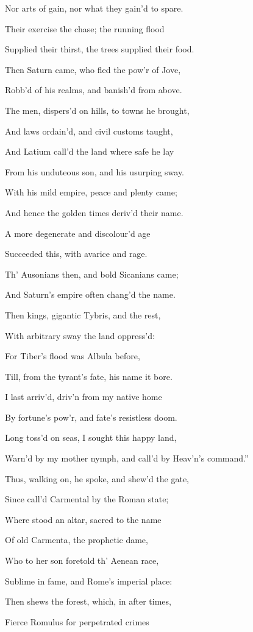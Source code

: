 Nor arts of gain, nor what they gain’d to spare.

Their exercise the chase; the running flood

Supplied their thirst, the trees supplied their food.

Then Saturn came, who fled the pow’r of Jove,

Robb’d of his realms, and banish’d from above.

The men, dispers’d on hills, to towns he brought,

And laws ordain’d, and civil customs taught,

And Latium call’d the land where safe he lay

From his unduteous son, and his usurping sway.

With his mild empire, peace and plenty came;

And hence the golden times deriv’d their name.

A more degenerate and discolour’d age

Succeeded this, with avarice and rage.

Th’ Ausonians then, and bold Sicanians came;

And Saturn’s empire often chang’d the name.

Then kings, gigantic Tybris, and the rest,

With arbitrary sway the land oppress’d:

For Tiber’s flood was Albula before,

Till, from the tyrant’s fate, his name it bore.

I last arriv’d, driv’n from my native home

By fortune’s pow’r, and fate’s resistless doom.

Long toss’d on seas, I sought this happy land,

Warn’d by my mother nymph, and call’d by Heav’n’s command.”

Thus, walking on, he spoke, and shew’d the gate,

Since call’d Carmental by the Roman state;

Where stood an altar, sacred to the name

Of old Carmenta, the prophetic dame,

Who to her son foretold th’ Aenean race,

Sublime in fame, and Rome’s imperial place:

Then shews the forest, which, in after times,

Fierce Romulus for perpetrated crimes

